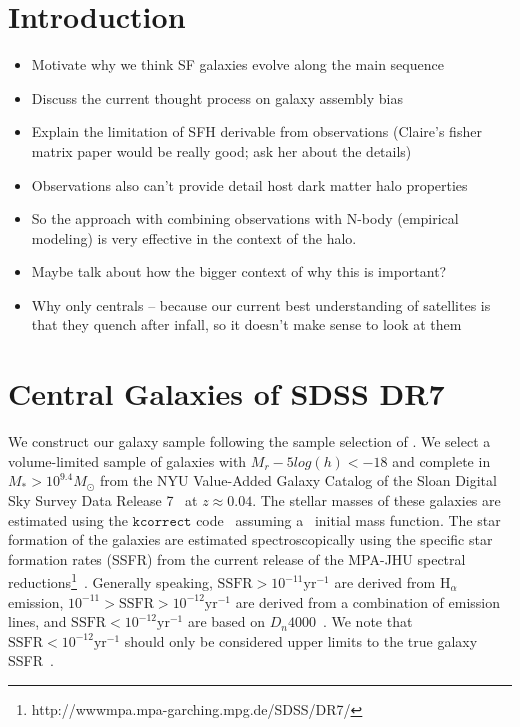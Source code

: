 \documentclass[12pt, letterpaper, preprint]{aastex}
\newcommand{\bitem}{\begin{itemize}}
\newcommand{\eitem}{\end{itemize}}
\begin{document}
\section{Introduction}
\bitem 
\item Motivate why we think SF galaxies evolve along the main sequence  
\item Discuss the current thought process on galaxy assembly bias 
\item Explain the limitation of SFH derivable from observations (Claire's fisher matrix paper would be really good; ask her about the details) 
\item Observations also can't provide detail host dark matter halo properties
\item So the approach with combining observations with N-body (empirical modeling) is very effective in the context of the halo.
\item Maybe talk about how the bigger context of why this is important?  
\item Why only centrals -- because our current best understanding of satellites is that they quench after infall, so it doesn't make sense to look at them
\eitem 

\section{Central Galaxies of SDSS DR7} \label{sec:sdss}
We construct our galaxy sample following the sample selection of \cite{tinker2011}. 
We select a volume-limited sample of galaxies with $M_r −5 log(h) < −18$ and complete in
$M_* > 10^{9.4} M_\odot$ from the NYU Value-Added Galaxy Catalog \citep[VAGC;][]{blanton2005}
of the Sloan Digital Sky Survey Data Release 7~\citep[SDSS DR7;][]{abazajian2009} at 
$z \approx 0.04$. The stellar masses of these galaxies are estimated using the
$\mathtt{kcorrect}$ code~\citep{blanton2007} assuming a~\cite{chabrier2003} initial
mass function. The star formation of the galaxies are estimated spectroscopically using the
specific star formation rates (SSFR) from the current release of the MPA-JHU spectral 
reductions\footnote{http://wwwmpa.mpa-garching.mpg.de/SDSS/DR7/}~\citep{brinchmann2004}.
Generally speaking, $\mathrm{SSFR} > 10^{-11}\mathrm{yr}^{-1}$ are derived from 
$\mathrm{H}_\alpha$ emission, $10^{-11} > \mathrm{SSFR} > 10^{-12}\mathrm{yr}^{-1}$
are derived from a combination of emission lines, and $\mathrm{SSFR} < 10^{-12}\mathrm{yr}^{-1}$
are based on $D_n 4000$~\citep[see discussion in][]{wetzel2013}. We note that 
$\mathrm{SSFR} < 10^{-12}\mathrm{yr}^{-1}$ should only be considered upper limits 
to the true galaxy SSFR~\citep{salim2007}.
\end{document}
